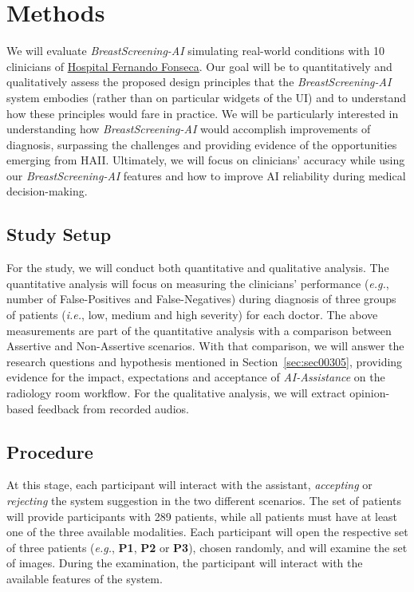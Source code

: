 \section{Methods}
\label{sec:sec004}

We will evaluate {\it BreastScreening-AI} simulating real-world conditions with 10 clinicians of \hyperlink{https://hff.min-saude.pt/}{Hospital Fernando Fonseca}.
Our goal will be to quantitatively and qualitatively assess the proposed design principles that the {\it BreastScreening-AI} system embodies (rather than on particular widgets of the UI) and to understand how these principles would fare in practice.
We will be particularly interested in understanding how {\it BreastScreening-AI} would accomplish improvements of diagnosis, surpassing the challenges and providing evidence of the opportunities emerging from HAII.
Ultimately, we will focus on clinicians' accuracy while using our {\it BreastScreening-AI} features and how to improve AI reliability during medical decision-making.

\subsection{Study Setup}
\label{sec:sec00403}

For the study, we will conduct both quantitative and qualitative analysis.
The quantitative analysis will focus on measuring the clinicians' performance ({\it e.g.}, number of False-Positives and False-Negatives) during diagnosis of three groups of patients ({\it i.e.}, low, medium and high severity) for each doctor.
The above measurements are part of the quantitative analysis with a comparison between Assertive and Non-Assertive scenarios.
With that comparison, we will answer the  research questions and hypothesis mentioned in Section~\ref{sec:sec00305}, providing evidence for the impact, expectations and acceptance of {\it AI-Assistance} on the radiology room workflow.
For the qualitative analysis, we will extract opinion-based feedback from recorded audios.

\subsection{Procedure}
\label{sec:sec00404}

At this stage, each participant will interact with the assistant, {\it accepting} or {\it rejecting} the system suggestion in the two different scenarios.
The set of patients will provide participants with 289 patients, while all patients must have at least one of the three available modalities.
Each participant will open the respective set of three patients ({\it e.g.}, {\bf P1}, {\bf P2} or {\bf P3}), chosen randomly, and will examine the set of images.
During the examination, the participant will interact with the available features of the system.

